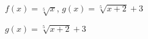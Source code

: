 {$f(x) = \sqrt[5]{x}$, $g(x) = \sqrt[5]{x + 2} + 3$}
{$g(x) = \sqrt[5]{x + 2} + 3$\\
\begin{center}
\end{center}}


